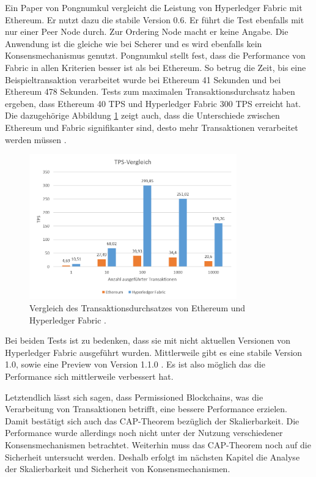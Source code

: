 Ein Paper von Pongnumkul vergleicht die Leistung von Hyperledger Fabric mit Ethereum. Er nutzt dazu die stabile Version 0.6. Er führt die Test ebenfalls mit nur einer Peer Node durch. Zur Ordering Node macht er keine Angabe. Die Anwendung ist die gleiche wie bei Scherer und es wird ebenfalls kein Konsensmechanismus genutzt. Pongnumkul stellt fest, dass die Performance von Fabric in allen Kriterien besser ist als bei Ethereum. So betrug die Zeit, bis eine Beispieltransaktion verarbeitet wurde bei Ethereum 41 Sekunden und bei Ethereum 478 Sekunden. Tests zum maximalen Transaktionsdurchsatz haben ergeben, dass Ethereum 40 TPS und Hyperledger Fabric 300 TPS erreicht hat. Die dazugehörige Abbildung \ref{fig:tps-ethereum-vs-hyperledger} zeigt auch, dass die Unterschiede zwischen Ethereum und Fabric signifikanter sind, desto mehr Transaktionen verarbeitet werden müssen \cite{PongnumkulPerformanceAnalysisPrivate2017}.

\begin{figure}[!htbp]
  \centering
    \includegraphics[width=0.8\textwidth,angle=0]{images/tps-ethvshyp}
     \caption{Vergleich des Transaktionsdurchsatzes von Ethereum und Hyperledger Fabric \cite{PongnumkulPerformanceAnalysisPrivate2017}.}
    \label{fig:tps-ethereum-vs-hyperledger}
\end{figure} 

Bei beiden Tests ist zu bedenken, dass sie mit nicht aktuellen Versionen von Hyperledger Fabric ausgeführt wurden. Mittlerweile gibt es eine stabile Version 1.0, sowie eine Preview von Version 1.1.0 \cite{HyperledgerFabricTeamHyperledgerFabricReleases2018}. Es ist also möglich das die Performance sich mittlerweile verbessert hat.

Letztendlich lässt sich sagen, dass Permissioned Blockchains, was die Verarbeitung von Transaktionen betrifft, eine bessere Performance erzielen. Damit bestätigt sich auch das CAP-Theorem bezüglich der Skalierbarkeit. Die Performance wurde allerdings noch nicht unter der Nutzung verschiedener Konsensmechanismen betrachtet. Weiterhin muss das CAP-Theorem noch auf die Sicherheit untersucht werden. Deshalb erfolgt im nächsten Kapitel die Analyse der Skalierbarkeit und Sicherheit von Konsensmechanismen.

